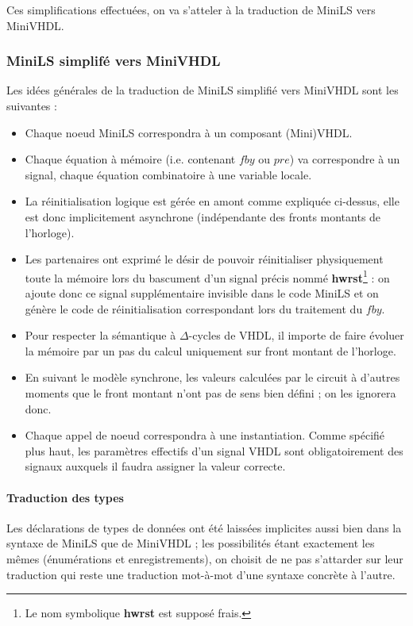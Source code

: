 \documentclass[9pt,a4paper]{article}
\begin{document}
Ces simplifications effectuées, on va s'atteler à la traduction de MiniLS vers
MiniVHDL.

\subsubsection{MiniLS simplifé vers MiniVHDL}

Les idées générales de la traduction de MiniLS simplifié vers MiniVHDL sont les
suivantes :

\begin{itemize}
\item Chaque noeud MiniLS correspondra à un composant (Mini)VHDL.
\item Chaque équation à mémoire (i.e. contenant $fby$ ou $pre$) va correspondre
  à un signal, chaque équation combinatoire à une variable locale.
\item La réinitialisation logique est gérée en amont comme expliquée ci-dessus,
  elle est donc implicitement asynchrone (indépendante des fronts montants de
  l'horloge).
\item Les partenaires ont exprimé le désir de pouvoir réinitialiser physiquement
  toute la mémoire lors du bascument d'un signal précis nommé
  \textbf{hwrst}\footnote{Le nom symbolique \textbf{hwrst} est supposé frais.} : on ajoute donc ce signal
  supplémentaire invisible dans le code MiniLS et on génère le code de
  réinitialisation correspondant lors du traitement du $fby$.
\item Pour respecter la sémantique à $\Delta$-cycles de VHDL, il importe de
  faire évoluer la mémoire par un pas du calcul uniquement sur front montant de
  l'horloge.
\item En suivant le modèle synchrone, les valeurs calculées par le circuit à
  d'autres moments que le front montant n'ont pas de sens bien défini ; on les
  ignorera donc.
\item Chaque appel de noeud correspondra à une instantiation. Comme spécifié
  plus haut, les paramètres effectifs d'un signal VHDL sont obligatoirement des
  signaux auxquels il faudra assigner la valeur correcte.
\end{itemize}

\paragraph{Traduction des types}

Les déclarations de types de données ont été laissées implicites aussi bien dans
la syntaxe de MiniLS que de MiniVHDL ; les possibilités étant exactement les
mêmes (énumérations et enregistrements), on choisit de ne pas s'attarder sur
leur traduction qui reste une traduction mot-à-mot d'une syntaxe concrète à
l'autre.
\end{document}
